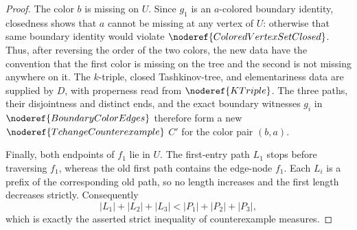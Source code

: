 \begin{proof}
The color \(b\) is missing on \(U\).  Since \(g_1\) is an \(a\)-colored
boundary identity, closedness shows that \(a\) cannot be missing at
any vertex of \(U\): otherwise that same boundary identity would violate
\(\noderef{ColoredVertexSetClosed}\).  Thus, after reversing the order
of the two colors, the new data have the convention that the first color
is missing on the tree and the second is not missing anywhere on it.
The \(k\)-triple, closed Tashkinov-tree,
and elementariness data are supplied by \(D\), with properness read from
\(\noderef{KTriple}\).  The three paths, their
disjointness and distinct ends, and the exact boundary witnesses \(g_i\)
in \(\noderef{BoundaryColorEdges}\) therefore form a new
\(\noderef{TchangeCounterexample}\) \(C'\) for the
color pair \((b,a)\).

Finally, both endpoints of \(f_1\) lie in \(U\).  The first-entry path
\(L_1\) stops before traversing \(f_1\), whereas the old first path contains
the edge-node \(f_1\).  Each \(L_i\) is a prefix of the corresponding old
path, so no length increases and the first length decreases strictly.
Consequently
\[
 |L_1|+|L_2|+|L_3|<|P_1|+|P_2|+|P_3|,
\]
which is exactly the asserted strict inequality of counterexample
measures.
\end{proof}
